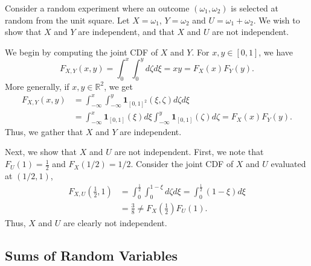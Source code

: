 \begin{example}
Consider a random experiment where an outcome $(\omega_1, \omega_2)$ is selected at random from the unit square.
Let $X = \omega_1$, $Y = \omega_2$ and $U = \omega_1 + \omega_2$.
We wish to show that $X$ and $Y$ are independent, and that $X$ and $U$ are not independent.

We begin by computing the joint CDF of $X$ and $Y$.
For $x,y \in [0,1]$, we have
\begin{equation*}
F_{X,Y}(x,y) = \int_0^{x} \int_0^{y} d\zeta d\xi
= x y = F_X(x) F_Y(y) .
\end{equation*}
More generally, if $x, y \in \mathbb{R}^2$, we get
\begin{equation*}
\begin{split}
F_{X,Y}(x,y)
&= \int_{-\infty}^{x} \int_{-\infty}^{y}
\mathbf{1}_{[0,1]^2} (\xi, \zeta) d\zeta d\xi \\
&= \int_{-\infty}^{x} \mathbf{1}_{[0,1]} (\xi) d \xi
\int_{-\infty}^{y} \mathbf{1}_{[0,1]} (\zeta) d\zeta
= F_X(x) F_Y(y) .
\end{split}
\end{equation*}
Thus, we gather that $X$ and $Y$ are independent.

Next, we show that $X$ and $U$ are not independent.
First, we note that $F_U (1) = \frac{1}{2}$ and $F_X (1/2) = 1/2$.
Consider the joint CDF of $X$ and $U$ evaluated at $(1/2, 1)$,
\begin{equation*}
\begin{split}
F_{X,U} \left( \frac{1}{2} ,1 \right)
&= \int_{0}^{\frac{1}{2}} \int_{0}^{1-\xi} d\zeta d\xi
= \int_{0}^{\frac{1}{2}} (1 - \xi) d\xi \\
&= \frac{3}{8}
\neq F_X \left( \frac{1}{2} \right) F_U(1) .
\end{split}
\end{equation*}
Thus, $X$ and $U$ are clearly not independent.
\end{example}


\subsection{Sums of Random Variables}

